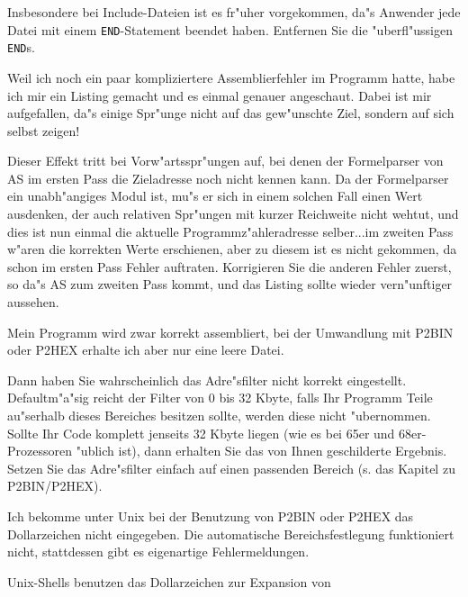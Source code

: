 \documentclass[12pt,a4paper,twoside]{report}
\newcommand{\tty}[1]{{\tt #1}}
\begin{document}
{\begin{description}
{	  Insbesondere bei Include-Dateien ist es fr"uher vorgekommen, da"s
	  Anwender jede Datei mit einem \tty{END}-Statement beendet haben.
	  Entfernen Sie die "uberfl"ussigen \tty{END}s.}
\vspace{0.3cm}
\item[F:]{Weil ich noch ein paar kompliziertere Assemblierfehler im Programm
          hatte, habe ich mir ein Listing gemacht und es einmal genauer
          angeschaut.  Dabei ist mir aufgefallen, da"s einige Spr"unge nicht
          auf das gew"unschte Ziel, sondern auf sich selbst zeigen!}
\item[A:]{Dieser Effekt tritt bei Vorw"artsspr"ungen auf, bei denen der
          Formelparser von AS im ersten Pass die Zieladresse noch nicht kennen
          kann.  Da der Formelparser ein unabh"angiges Modul ist, mu"s er sich
          in einem solchen Fall einen Wert ausdenken, der auch relativen
          Spr"ungen mit kurzer Reichweite nicht wehtut, und dies ist nun
          einmal die aktuelle Programmz"ahleradresse selber...im zweiten Pass
          w"aren die korrekten Werte erschienen, aber zu diesem ist es nicht
          gekommen, da schon im ersten Pass Fehler auftraten.  Korrigieren
          Sie die anderen Fehler zuerst, so da"s AS zum zweiten Pass kommt,
          und das Listing sollte wieder vern"unftiger aussehen.}
\vspace{0.3cm}
\item[F:]{Mein Programm wird zwar korrekt assembliert, bei der Umwandlung
          mit P2BIN oder P2HEX erhalte ich aber nur eine leere Datei.}
\item[A:]{Dann haben Sie wahrscheinlich das Adre"s\-fil\-ter nicht korrekt
          eingestellt.  De\-faul\-tm"a"sig reicht der Filter von 0 bis 32
	  Kbyte, falls Ihr Programm Teile au"serhalb dieses Bereiches
	  besitzen sollte, werden diese nicht "ubernommen.  Sollte Ihr
	  Code komplett jenseits 32 Kbyte liegen (wie es bei 65er und
	  68er-Prozessoren "ublich ist), dann erhalten Sie das von Ihnen
	  geschilderte Ergebnis.  Setzen Sie das Adre"sfilter einfach auf
	  einen passenden Bereich (s. das Kapitel zu P2BIN/P2HEX).}
\vspace{0.3cm}
\item[F:]{Ich bekomme unter Unix bei der Benutzung von P2BIN oder P2HEX
          das Dollarzeichen nicht eingegeben.  Die automatische
          Bereichsfestlegung funktioniert nicht, stattdessen gibt es
          eigenartige Fehlermeldungen.}
\item[A:]{Unix-Shells benutzen das Dollarzeichen zur Expansion von
}
\end{description}}
\end{document}

